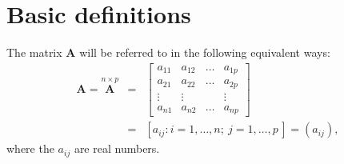 \documentclass[]{book}
\theoremstyle{definition}
\theoremstyle{definition}
\theoremstyle{definition}
\theoremstyle{remark}
\begin{document}
\renewcommand{\bY}{\boldsymbol Y}
\renewcommand{\bx}{\boldsymbol x}
\renewcommand{\bX}{\boldsymbol X}
\renewcommand{\bH}{\boldsymbol H}
\renewcommand{\by}{\boldsymbol y}
\renewcommand{\bz}{\boldsymbol z}
\renewcommand{\bS}{\boldsymbol S}
\renewcommand{\bR}{\boldsymbol R}
\renewcommand{\bI}{\boldsymbol I}
\renewcommand{\bmu}{\boldsymbol \mu}
\renewcommand{\bSigma}{\boldsymbol \Sigma}
\renewcommand{\bLambda}{\boldsymbol \Lambda}
\renewcommand{\bgamma}{\boldsymbol \gamma}
\renewcommand{\blambda}{\boldsymbol \lambda}
\renewcommand{\bA}{\boldsymbol A}
\renewcommand{\bB}{\boldsymbol B}
\renewcommand{\bD}{\boldsymbol D}
\renewcommand{\bM}{\boldsymbol M}
\renewcommand{\bP}{\boldsymbol P}
\renewcommand{\bQ}{\boldsymbol Q}
\renewcommand{\bT}{\boldsymbol T}
\renewcommand{\bW}{\boldsymbol W}
\renewcommand{\ba}{\boldsymbol a}
\renewcommand{\bb}{\boldsymbol b}
\renewcommand{\bc}{\boldsymbol c}
\renewcommand{\bd}{\boldsymbol d}
\renewcommand{\bh}{\boldsymbol h}
\renewcommand{\bp}{\boldsymbol p}
\renewcommand{\bq}{\boldsymbol q}
\renewcommand{\bu}{\boldsymbol u}
\renewcommand{\bzero}{\boldsymbol 0}
\renewcommand{\mR}{\mathbb R}
\renewcommand{\cR}{\mathcal R}

\renewcommand{\bs}{\boldsymbol}
\renewcommand{\ds}{\displaystyle}
\renewcommand{\tdiag}{\text{diag}}
\renewcommand{\ttr}{\text{tr}}
\renewcommand{\tdet}{\text{det}}

\renewcommand{\tcov}{\text{cov}}
\renewcommand{\texp}{\text{exp}}
\renewcommand{\lb}{\left(}
\renewcommand{\rb}{\right)}
\renewcommand{\lsb}{\left[}
\renewcommand{\rsb}{\right]}

\hypertarget{basic-definitions}{%
\section{Basic definitions}\label{basic-definitions}}

The matrix \({\mathbf A}\) will be referred to in the following equivalent ways:
\begin{eqnarray*}
{\mathbf A}=\stackrel{n\times p}{\mathbf A} &=& \left[\begin{array}{cccc}
a_{11}&a_{12}&\dots&a_{1p}\\
a_{21}&a_{22}&\dots&a_{2p}\\
\vdots&\vdots&&\vdots\\
a_{n1}&a_{n2}&\dots&a_{np}
\end{array} \right] \\
&=& [a_{ij}: i=1,\dots ,n;\ j=1,\dots ,p\,]=(a_{ij}),
\end{eqnarray*}
where the \(a_{ij}\) are real numbers.
\end{document}
